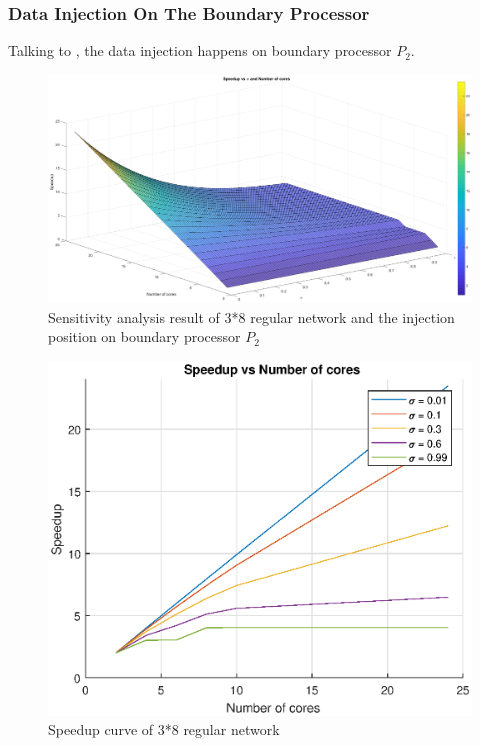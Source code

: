 \newpage
\subsubsection{Data Injection On The Boundary Processor}
Talking to , the data injection happens on boundary processor $P_{2}$. 

\begin{figure}[!ht]
\centering
\includegraphics[width=1\columnwidth]{figure/sa3t8b.eps}
\caption{Sensitivity analysis result of 3*8 regular network and the injection position on boundary processor $P_{2}$}
\label{fig:sa3t8b}
\end{figure}

\begin{figure}[!ht]
\centering
\includegraphics[width=1\columnwidth]{figure/sa3t8b_curve.eps}
\caption{Speedup curve of 3*8 regular network}
\label{fig:sa3t8b_curve}
\end{figure}
\newpage

